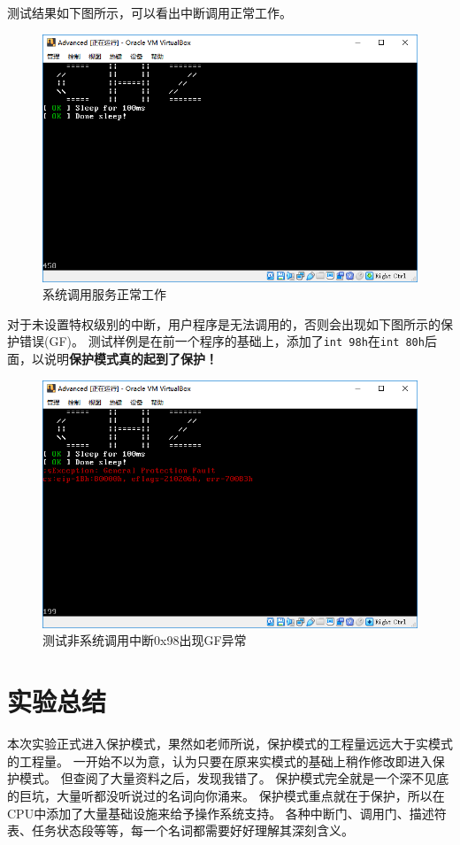 \documentclass[logo,reportComp]{thesis}
\begin{document}
测试结果如下图所示，可以看出中断调用正常工作。
\begin{figure}[H]
\centering
\includegraphics[width=0.8\linewidth]{fig/syscall.PNG}
\caption{系统调用服务正常工作}
\end{figure}

对于未设置特权级别的中断，用户程序是无法调用的，否则会出现如下图所示的保护错误(GF)。
测试样例是在前一个程序的基础上，添加了\verb'int 98h'在\verb'int 80h'后面，以说明\textbf{保护模式真的起到了保护！}
\begin{figure}[H]
\centering
\includegraphics[width=0.8\linewidth]{fig/syscall-GF.PNG}
\caption{测试非系统调用中断0x98出现GF异常}
\end{figure}

\section{实验总结}
本次实验正式进入保护模式，果然如老师所说，保护模式的工程量远远大于实模式的工程量。
一开始不以为意，认为只要在原来实模式的基础上稍作修改即进入保护模式。
但查阅了大量资料之后，发现我错了。
保护模式完全就是一个深不见底的巨坑，大量听都没听说过的名词向你涌来。
保护模式重点就在于保护，所以在CPU中添加了大量基础设施来给予操作系统支持。
各种中断门、调用门、描述符表、任务状态段等等，每一个名词都需要好好理解其深刻含义。
\end{document}
